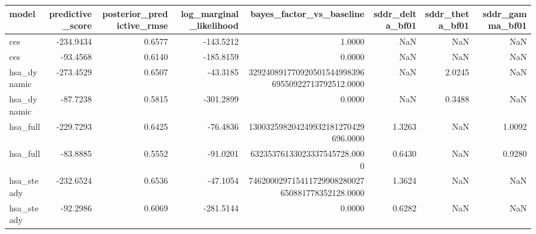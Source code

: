 \begin{tabular}{lrrrrrrr}
\toprule
model & predictive\_score & posterior\_predictive\_rmse & log\_marginal\_likelihood & bayes\_factor\_vs\_baseline & sddr\_delta\_bf01 & sddr\_theta\_bf01 & sddr\_gamma\_bf01 \\
\midrule
ces & -234.9434 & 0.6577 & -143.5212 & 1.0000 & NaN & NaN & NaN \\
ces & -93.4568 & 0.6140 & -185.8159 & 0.0000 & NaN & NaN & NaN \\
hsa\_dynamic & -273.4529 & 0.6507 & -43.3185 & 32924089177092050154499839669550922713792512.0000 & NaN & 2.0245 & NaN \\
hsa\_dynamic & -87.7238 & 0.5815 & -301.2899 & 0.0000 & NaN & 0.3488 & NaN \\
hsa\_full & -229.7293 & 0.6425 & -76.4836 & 130032598204249932181270429696.0000 & 1.3263 & NaN & 1.0092 \\
hsa\_full & -83.8885 & 0.5552 & -91.0201 & 63235376133023337545728.0000 & 0.6430 & NaN & 0.9280 \\
hsa\_steady & -232.6524 & 0.6536 & -47.1054 & 746200029715411729908280027650881778352128.0000 & 1.3624 & NaN & NaN \\
hsa\_steady & -92.2986 & 0.6069 & -281.5144 & 0.0000 & 0.6282 & NaN & NaN \\
\bottomrule
\end{tabular}
